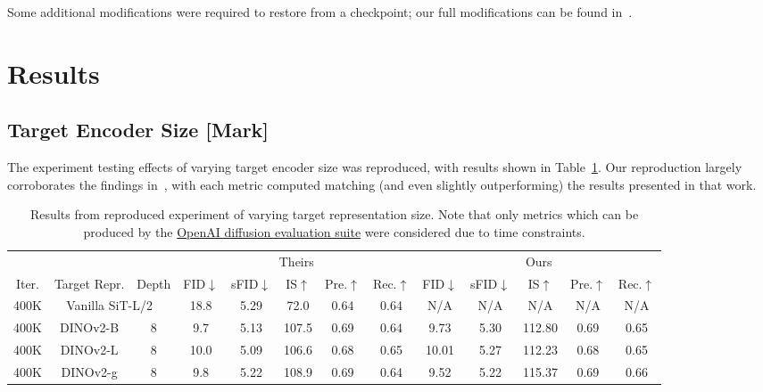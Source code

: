 \documentclass{article}
\begin{document}
Some additional modifications were required to restore from a checkpoint; our full modifications can be found in~\cite{reparepofork}.

\section{Results}\label{sec:results}

\subsection{Target Encoder Size [Mark]}\label{sec:target-encoder-size}

The experiment testing effects of varying target encoder size was reproduced, with results shown in Table~\ref{tab:tab-repr-target-size}. Our reproduction largely corroborates the findings in~\cite{yu2025repa}, with each metric computed matching (and even slightly outperforming) the results presented in that work.

\begin{table}[t]
    \centering
    \begin{tabular}{c c c | c c c c c | c c c c c }
        \toprule
              &              &           & \multicolumn{5}{c|}{Theirs} & \multicolumn{5}{c}{Ours} \\
        Iter. & Target Repr. & Depth & FID$\downarrow$ & sFID$\downarrow$ & IS$\uparrow$ & Pre.$\uparrow$ & Rec.$\uparrow$ & FID$\downarrow$ & sFID$\downarrow$ & IS$\uparrow$ & Pre.$\uparrow$ & Rec.$\uparrow$ \\
        \midrule
        400K & \multicolumn{2}{c|}{Vanilla SiT-L/2~\cite{sit}} & 18.8 & 5.29 & 72.0 & 0.64 & 0.64 & N/A & N/A & N/A & N/A & N/A \\
        \hline
        400K & DINOv2-B & 8 & 9.7 & 5.13 & 107.5 & 0.69 & 0.64  & 9.73 & 5.30  & 112.80 & 0.69 & 0.65  \\
        400K & DINOv2-L & 8 & 10.0 & 5.09 & 106.6 & 0.68 & 0.65 & 10.01 & 5.27 & 112.23 & 0.68 & 0.65       \\
        400K & DINOv2-g & 8 & 9.8 & 5.22 & 108.9 & 0.69 & 0.64 & 9.52 & 5.22 & 115.37 & 0.69 & 0.66 \\
        \bottomrule
    \end{tabular}
    \caption{Results from reproduced experiment of varying target representation size. Note that only metrics which can be produced by the \protect\href{https://github.com/openai/guided-diffusion}{OpenAI diffusion evaluation suite} were considered due to time constraints.}\label{tab:tab-repr-target-size}
\end{table}
\end{document}

